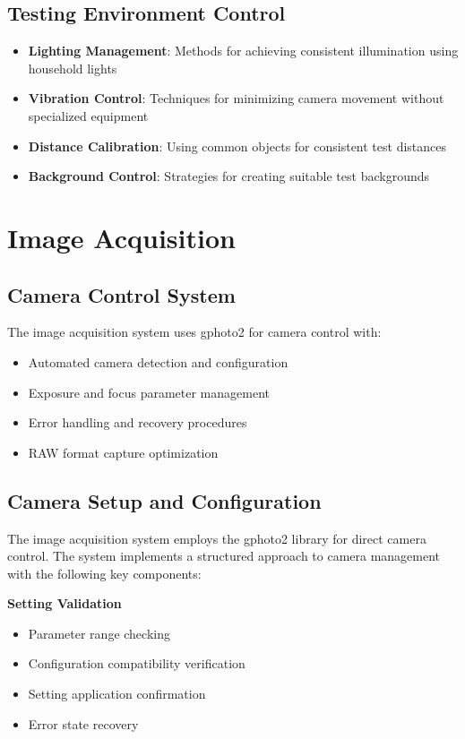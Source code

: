 \subsection{Testing Environment Control}
\begin{itemize}
    \item \textbf{Lighting Management}: Methods for achieving consistent illumination using household lights
    \item \textbf{Vibration Control}: Techniques for minimizing camera movement without specialized equipment
    \item \textbf{Distance Calibration}: Using common objects for consistent test distances
    \item \textbf{Background Control}: Strategies for creating suitable test backgrounds
\end{itemize}

\section{Image Acquisition}
\subsection{Camera Control System}
The image acquisition system uses gphoto2 for camera control with:
\begin{itemize}
    \item Automated camera detection and configuration
    \item Exposure and focus parameter management
    \item Error handling and recovery procedures
    \item RAW format capture optimization
\end{itemize}

\subsection{Camera Setup and Configuration}
The image acquisition system employs the gphoto2 library for direct camera control. The system implements a structured approach to camera management with the following key components:

\textbf{Setting Validation}
\begin{itemize}
    \item Parameter range checking
    \item Configuration compatibility verification
    \item Setting application confirmation
    \item Error state recovery
\end{itemize}

